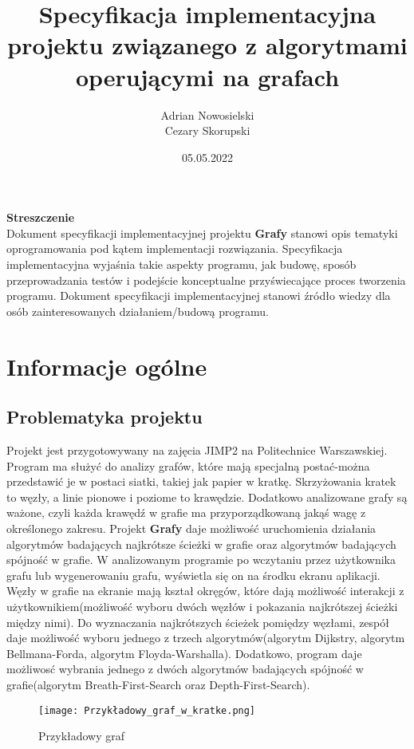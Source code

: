 \documentclass[10pt]{article}
\title{Specyfikacja implementacyjna projektu związanego z algorytmami operującymi na grafach}
\author{Adrian Nowosielski\\Cezary Skorupski}
\date{05.05.2022}
\begin{document}
\maketitle
\thispagestyle{empty}
\newpage
\thispagestyle{empty}
\begin{center}
    \textbf{\Large{Streszczenie}}\\
    Dokument specyfikacji implementacyjnej projektu \textbf{Grafy} stanowi opis tematyki oprogramowania pod kątem implementacji rozwiązania. Specyfikacja implementacyjna wyjaśnia takie aspekty programu, jak budowę, sposób przeprowadzania testów i podejście konceptualne przyświecające proces tworzenia programu. Dokument specyfikacji implementacyjnej stanowi źródło wiedzy dla osób zainteresowanych działaniem/budową programu.
\end{center}
\newpage
\newpage
\begin{center}
    \tableofcontents
    \thispagestyle{empty}
\end{center}
\newpage
{}
\section{Informacje ogólne}
\subsection{Problematyka projektu}
Projekt jest przygotowywany na zajęcia JIMP2 na Politechnice Warszawskiej. Program ma służyć do analizy grafów, które mają specjalną postać-można przedstawić je w postaci siatki, takiej jak papier w kratkę. Skrzyżowania kratek to węzły, a linie pionowe i poziome to krawędzie. Dodatkowo analizowane grafy są ważone, czyli każda krawędź w grafie ma przyporządkowaną jakąś wagę z określonego zakresu. Projekt \textbf{Grafy} daje możliwość uruchomienia działania algorytmów badających najkrótsze ścieżki w grafie oraz algorytmów badających spójność w grafie. W analizowanym programie po wczytaniu przez użytkownika grafu lub wygenerowaniu grafu, wyświetla się on na środku ekranu aplikacji. Węzły w grafie na ekranie mają kształ okręgów, które dają możliwość interakcji z użytkownikiem(możliwość wyboru dwóch węzłów i pokazania najkrótszej ścieżki między nimi). Do wyznaczania najkrótszych ścieżek pomiędzy węzłami, zespół daje możliwość wyboru jednego z trzech algorytmów(algorytm Dijkstry, algorytm Bellmana-Forda, algorytm Floyda-Warshalla). Dodatkowo, program daje możliwosć wybrania jednego z dwóch algorytmów badających spójność w grafie(algorytm Breath-First-Search oraz Depth-First-Search).
\begin{figure}[h]
\centering
\texttt{[image: Przykładowy\_graf\_w\_kratke.png]}
\caption{Przykładowy graf}
\end{figure}
\end{document}
